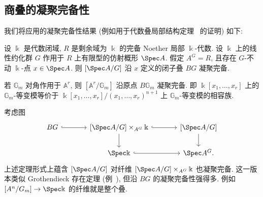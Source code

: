 \subsection{商叠的凝聚完备性}\label{src:7.6.3-subsection}
我们将应用的凝聚完备性结果 (例如用于代数叠局部结构定理~ 的证明) 如下:
\begin{theorem}\label{src:7.6.13}
设 $\Bbbk$ 是代数闭域, $R$ 是剩余域为 $\Bbbk$ 的完备 Noether 局部 $\Bbbk$-代数. 设 $\Bbbk$ 上的线性约化群 $G$ 作用于 $R$ 上有限型的仿射概形 $\Spec A$. 假定 $A^G=R$, 且存在 $G$-不动 $\Bbbk$-点 $x\in\Spec A$. 则 $[\Spec A/G]$ 沿 $x$ 定义的闭子叠 $BG$ 凝聚完备.
\end{theorem}
\begin{example}\label{src:7.6.14}
若 $\mathbb G_m$ 对角作用于 $\mathbb A^r$, 则 $[\mathbb A^r/\mathbb G_m]$ 沿原点 $B\mathbb G_m$ 凝聚完备. 即 $\Bbbk[x_1,\ldots,x_r]$ 上的 $\mathbb G_m$-等变模等价于 $\Bbbk[x_1,\ldots,x_r]/(x_1,\ldots,x_r)^{n+1}$ 上 $\mathbb G_m$-等变模的相容族.
\end{example}
\begin{remark}\label{src:7.6.15}
考虑图
\begin{align*}
\begin{tikzcd}[ampersand replacement=\&,column sep=large]
BG\arrow[r,hook]\&{[\Spec A/G]\times_{A^G}\Bbbk}\arrow[r,hook]\arrow[d]\&{[\Spec A/G]}\arrow[d]\\
\&\Spec\Bbbk\arrow[r,hook]\&\Spec A^G.
\end{tikzcd}
\end{align*}
上述定理形式上蕴含 $[\Spec A/G]$ 对纤维 $[\Spec A/G]\times_{A^G}\Bbbk$ 也凝聚完备. 这一版本类似 Grothendieck 存在定理 (例~), 但沿 $BG$ 的凝聚完备性强得多. 例如 $[\mathbb A^n/\mathbb G_m]\to\Spec\Bbbk$ 的纤维就是整个叠.
\end{remark}
